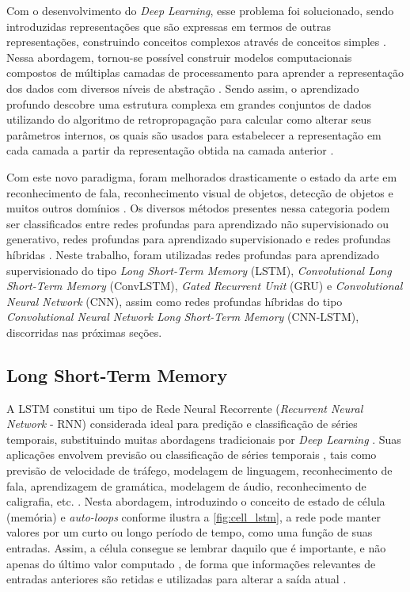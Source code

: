 Com o desenvolvimento do \textit{Deep Learning}, esse problema foi solucionado, sendo introduzidas representações que são expressas em termos de outras representações, construindo conceitos complexos através de conceitos simples \cite{Goodfellow2016}. Nessa abordagem, tornou-se possível construir modelos computacionais compostos de múltiplas camadas de processamento para aprender a representação dos dados com diversos níveis de abstração \cite{LeCun2015}. Sendo assim, o aprendizado profundo descobre uma estrutura complexa em grandes conjuntos de dados utilizando do algoritmo de retropropagação para calcular como alterar seus parâmetros internos, os quais são usados para estabelecer a representação em cada camada a partir da representação obtida na camada anterior \cite{LeCun2015}.

Com este novo paradigma, foram melhorados drasticamente o estado da arte em reconhecimento de fala, reconhecimento visual de objetos, detecção de objetos e muitos outros domínios \cite{LeCun2015}. Os diversos métodos presentes nessa categoria podem ser classificados entre redes profundas para aprendizado não supervisionado ou generativo, redes profundas para aprendizado supervisionado e redes profundas híbridas \cite{Deng2014}. Neste trabalho, foram utilizadas redes  profundas para aprendizado supervisionado do tipo \textit{Long Short-Term Memory} (LSTM), \textit{Convolutional Long Short-Term Memory} (ConvLSTM), \textit{Gated Recurrent Unit} (GRU)  e \textit{Convolutional Neural Network} (CNN), assim como redes profundas híbridas do tipo \textit{Convolutional Neural Network Long Short-Term Memory} (CNN-LSTM), discorridas nas próximas seções.

\subsection{Long Short-Term Memory}

A LSTM constitui um tipo de Rede Neural Recorrente (\textit{Recurrent Neural Network} - RNN) considerada ideal para predição e classificação de séries temporais, substituindo muitas abordagens tradicionais por \textit{Deep Learning} \cite{Zaccone2017}. Suas aplicações envolvem previsão ou classificação de séries temporais \cite{Zaccone2017}, tais como previsão de velocidade de tráfego, modelagem de linguagem, reconhecimento de fala, aprendizagem de gramática, modelagem de áudio, reconhecimento de caligrafia, etc. \cite{Bianchi2017}. Nesta abordagem, introduzindo o conceito de estado de célula (memória) e \textit{auto-loops} conforme ilustra a \autoref{fig:cell_lstm}, a rede pode manter valores por um curto ou longo período de tempo, como uma função de suas entradas. Assim, a célula consegue se lembrar daquilo que é importante, e não apenas do último valor computado \cite{Jones2017}, de forma que informações relevantes de entradas anteriores são retidas e utilizadas para alterar a saída atual \cite{Zebin2018}.

